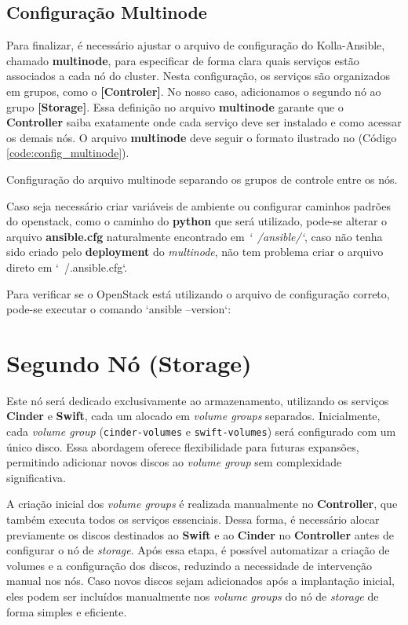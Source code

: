 \subsection{Configuração Multinode}
Para finalizar, é necessário ajustar o arquivo de configuração do Kolla-Ansible, chamado \textbf{multinode}, para especificar de forma clara quais serviços estão associados a cada nó do cluster. Nesta configuração, os serviços são organizados em grupos, como o \textbf{[Controler]}. No nosso caso, adicionamos o segundo nó ao grupo \textbf{[Storage]}. Essa definição no arquivo \textbf{multinode} garante que o \textbf{Controller} saiba exatamente onde cada serviço deve ser instalado e como acessar os demais nós. O arquivo \textbf{multinode} deve seguir o formato ilustrado no (Código \ref{code:config_multinode}).

\begin{listing}[h!]
    \noindent{}  
  \caption{Configuração do arquivo multinode separando os grupos de controle entre os nós.}
  \label{code:config_multinode}
\end{listing}

Caso seja necessário criar variáveis de ambiente ou configurar caminhos padrões do openstack, como o caminho do \textbf{python} que será utilizado, pode-se alterar o arquivo \textbf{ansible.cfg} naturalmente encontrado em \textit{`~/ansible/`}, caso não tenha sido criado pelo \textbf{deployment} do \textit{multinode}, não tem problema criar o arquivo direto em `~/.ansible.cfg`. 

Para verificar se o OpenStack está utilizando o arquivo de configuração correto, pode-se executar o comando `ansible --version`:

\section{Segundo Nó (Storage)}

Este nó será dedicado exclusivamente ao armazenamento, utilizando os serviços \textbf{Cinder} e \textbf{Swift}, cada um alocado em \textit{volume groups} separados. Inicialmente, cada \textit{volume group} (\texttt{cinder-volumes} e \texttt{swift-volumes}) será configurado com um único disco. Essa abordagem oferece flexibilidade para futuras expansões, permitindo adicionar novos discos ao \textit{volume group} sem complexidade significativa.

A criação inicial dos \textit{volume groups} é realizada manualmente no \textbf{Controller}, que também executa todos os serviços essenciais. Dessa forma, é necessário alocar previamente os discos destinados ao \textbf{Swift} e ao \textbf{Cinder} no \textbf{Controller} antes de configurar o nó de \textit{storage}. Após essa etapa, é possível automatizar a criação de volumes e a configuração dos discos, reduzindo a necessidade de intervenção manual nos nós. Caso novos discos sejam adicionados após a implantação inicial, eles podem ser incluídos manualmente nos \textit{volume groups} do nó de \textit{storage} de forma simples e eficiente.

